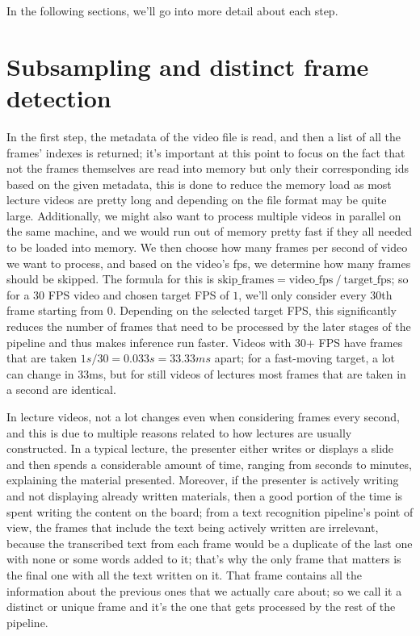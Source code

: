 In the following sections, we'll go into more detail about each step.

\section{Subsampling and distinct frame detection}

In the first step, the metadata of the video file is read, and then a list of all the frames' indexes is returned; it's important at this point to focus on the fact that not the frames themselves are read into memory but only their corresponding ids based on the given metadata, this is done to reduce the memory load as most lecture videos are pretty long and depending on the file format may be quite large. Additionally, we might also want to process multiple videos in parallel on the same machine, and we would run out of memory pretty fast if they all needed to be loaded into memory. We then choose how many frames per second of video we want to process, and based on the video's \gls{fps}, we determine how many frames should be skipped. The formula for this is  $\text{skip\_frames} = \text{video\_fps} \ / \ \text{target\_fps}$; so for a $30$ FPS video and chosen target FPS of $1$, we'll only consider every $30$th frame starting from $0$. Depending on the selected target FPS, this significantly reduces the number of frames that need to be processed by the later stages of the pipeline and thus makes inference run faster. Videos with 30+ FPS have frames that are taken $1s / 30 = 0.033s  = 33.33ms$ apart; for a fast-moving target, a lot can change in 33ms, but for still videos of lectures most frames that are taken in a second are identical.

In lecture videos, not a lot changes even when considering frames every second, and this is due to multiple reasons related to how lectures are usually constructed. In a typical lecture, the presenter either writes or displays a slide and then spends a considerable amount of time, ranging from seconds to minutes, explaining the material presented. Moreover, if the presenter is actively writing and not displaying already written materials, then a good portion of the time is spent writing the content on the board; from a text recognition pipeline's point of view, the frames that include the text being actively written are irrelevant, because the transcribed text from each frame would be a duplicate of the last one with none or some words added to it; that's why the only frame that matters is the final one with all the text written on it. That frame contains all the information about the previous ones that we actually care about; so we call it a distinct or unique frame and it's the one that gets processed by the rest of the pipeline.

